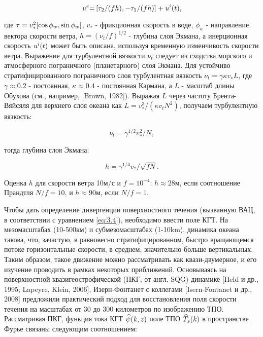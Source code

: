 \begin{equation} \label{eq:3.5} {\it u}^{e} {\it =}\left[\tau _{2} /(fh),-\tau _{1} /(fh)\right]+{\it u}^{i} (t),  \end{equation} 



\noindent где ${\it \tau }=v_{*}^{2} [\cos \phi _{w} ,\sin \phi _{w} ]$, $v_{*} $ - фрикционная скорость в воде, $\phi _{w} $ - направление вектора скорости ветра, $h=(\nu _{t} /f)^{1/2} $ - глубина слоя Экмана, а инерционная скорость ${\it u}^{i} (t)$ может быть описана, используя временную изменчивость скорости ветра. Выражение для турбулентной вязкости $\nu _{t} $ следует из сходства морского и атмосферного пограничного (планетарного) слоя Экмана. Для устойчиво стратифицированного пограничного слоя турбулентная вязкость $\nu _{t} =\gamma \kappa v_{*}^{} L$, где $\gamma \approx 0.2$ - постоянная, $\kappa \approx 0.4$ - постоянная Кармана, а $L$ - масштаб длины Обухова (см., например, [Brown, 1982]). Выражая $L$ через частоту Брента-Вяйсяля для верхнего слоя океана как $L=v_{*}^{3} /(\kappa v_{t} N^{2} )$, получаем турбулентную вязкость:



\begin{equation} \label{eq:3.6} \nu _{t} =\gamma ^{1/2} v_{*}^{2} /N,  \end{equation}



тогда глубина слоя Экмана:



\begin{equation} \label{eq:3.7} h=\gamma ^{1/4} v_{*} /\sqrt{fN} .  \end{equation} 



Оценка $h$ для скорости ветра 10м/с и $f=10^{-4} $: $h\approx 28$м, если соотношение Прандтля $N/f=10$, и $h\approx 90$м, если $N/f=1$.

Чтобы дать определение дивергенции поверхностного течения (вызванную ВАЦ, в соответствии с уравнением \eqref{eq:3.4}), необходимо ввести поле КГТ. На мезомасштабах (10-500км) и субмезомасштабах (1-10km), динамика океана такова, что, зачастую, в равновесно стратифицированном, быстро вращающемся потоке горизонтальные скорости, в среднем, значительно больше вертикальных. Таким образом, такое движение можно рассматривать как квази-двумерное, и его изучение проводить в рамках некоторых приближений. Основываясь на поверхностной квазигеострофической (ПКГ, от англ. SQG) динамике [Held и др., 1995; Lapeyre, Klein, 2006], Изерн-Фонтанет с коллегами [Isern-Fontanet и др., 2008] предложили практический подход для восстановления поля скорости течения на масштабах от 30 до 300 километров по изображению ТПО. Рассматривая ПКГ, функция тока КГТ $\widehat{\psi }({\it k},z)$ поле ТПО $\widehat{T}_{s} ({\it k})$ в пространстве Фурье связаны следующим соотношением:



